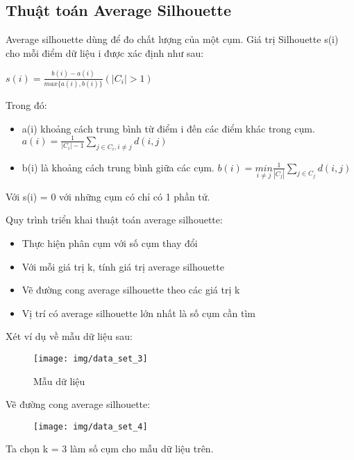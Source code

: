 \documentclass{article}
\begin{document}
\subsection{Thuật toán Average Silhouette}
Average silhouette dùng để đo chất lượng của một cụm. Giá trị Silhouette s(i) cho mỗi điểm dữ liệu i được xác định như sau:\\
\begin{center}
	\large
	$s(i) = \frac{b(i) - a(i)}{max\{a(i), b(i)\}} (|C_i| > 1)$
\end{center}\par
Trong đó:
\begin{itemize}
	\item a(i) khoảng cách trung bình từ điểm i đến các điểm khác trong cụm. $a(i) = \frac{1}{|C_i| - 1}\sum\limits_{j \in C_i, i \neq j}{d(i, j)}$
	\item b(i) là khoảng cách trung bình giữa các cụm. $b(i) = \underset{i \neq j}{min} \frac{1}{|C_j|}\sum\limits_{j \in C_j}{d(i, j)}$
\end{itemize}\par
Với s(i) = 0 với những cụm có chỉ có 1 phần tử.\par
\smallskip
Quy trình triển khai thuật toán average silhouette:
\begin{itemize}
	\item Thực hiện phân cụm với số cụm thay đổi
	\item Với mỗi giá trị k, tính giá trị average silhouette
	\item Vẽ đường cong average silhouette theo các giá trị k
	\item Vị trí có average silhouette lớn nhất là số cụm cần tìm
\end{itemize}
Xét ví dụ về mẫu dữ liệu sau:
\begin{figure}[h]
	\centering
	\texttt{[image: img/data\_set\_3]}
	\caption{Mẫu dữ liệu}
\end{figure}\par
Vẽ đường cong average silhouette:\par
\begin{figure}[h]
	\centering
	\texttt{[image: img/data\_set\_4]}
\end{figure}\par
Ta chọn k = 3 làm số cụm cho mẫu dữ liệu trên.
\end{document}
